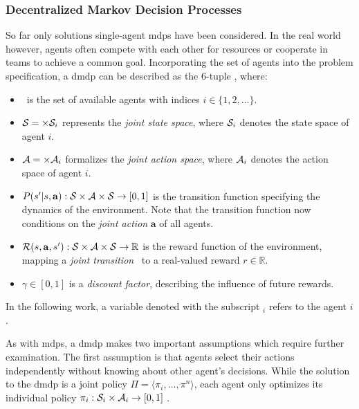 \subsubsection{Decentralized Markov Decision Processes}\label{sssec:dec_mdp}
So far only solutions single-agent \glspl{mdp} have been considered. In the real world however, agents often compete with each other for resources or cooperate in teams to achieve a common goal. Incorporating the set of agents into the problem specification, a \gls{dmdp} can be described as the $6$-tuple \dmdptuple \cite{oliehoekConciseIntroductionDecentralized2016, kurzerDecentralizedCooperativePlanning2018}, where:
\begin{itemize}
    \item \agentset\ is the set of available agents with indices $i \in \{1, 2, \ldots \}$.
    \item $\statespace = \times \statespace_i$ represents the \emph{joint state space}, where $\statespace_i$ denotes the state space of agent $i$.
    \item $\actionspace = \times \actionspace_i$ formalizes the \emph{joint action space}, where $\actionspace_i$ denotes the action space of agent $i$.
    \item $\jointtransitionfunc: \statespace \times \actionspace \times \statespace \rightarrow [0, 1]$ is the transition function specifying the dynamics of the environment. Note that the transition function now conditions on the \emph{joint action} $\mathbf a$ of all agents.
    \item $\jointrewardfunc: \statespace \times \actionspace \times \statespace \rightarrow \mathbb R$  is the reward function of the environment, mapping a \emph{joint transition} \jointtransition\ to a real-valued reward $r \in \mathbb R$.
    \item $\gamma \in [0, 1]$ is a \emph{discount factor}, describing the influence of future rewards.  
\end{itemize}
In the following work, a variable denoted with the subscript $_i$ refers to the agent $i$.

As with \glspl{mdp}, a \gls{dmdp} makes two important assumptions which require further examination. The first assumption is that agents select their actions independently without knowing about other agent's decisions. While the solution to the \gls{dmdp} is a joint policy $\Pi = \langle \pi_i, \ldots, \pi^n \rangle$, each agent only optimizes its individual policy $\pi_i: \statespace_i \times \actionspace_i \rightarrow [0, 1]$ \cite{oliehoekConciseIntroductionDecentralized2016}.

